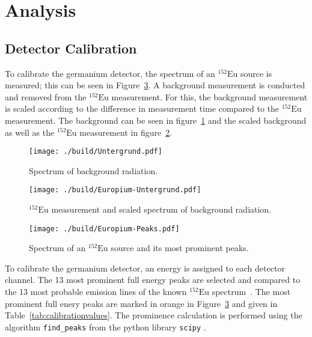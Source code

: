\section{Analysis}
\subsection{Detector Calibration}
To calibrate the germanium detector, the spectrum of an $^{152}\text{Eu}$
source is measured; this can be seen in Figure~\ref{fig:spectrumeu}. A
background measurement is conducted and removed from the $^{152}\text{Eu}$
measurement. For this, the background measurement is scaled according to
the difference in measurement time compared to the $^{152}\text{Eu}$
measurement. The background can be seen in figure~\ref{fig:background} and
the scaled background as well as the $^{152}\text{Eu}$ measurement in
figure~\ref{fig:eubackground}.
\begin{figure}
	\centering
	\begin{adjustbox}{width=1.4\textwidth, center}
		\texttt{[image: ./build/Untergrund.pdf]}
	\end{adjustbox}
	\caption{Spectrum of background radiation.}
	\label{fig:background}
\end{figure}
\begin{figure}
	\centering
	\begin{adjustbox}{width=1.4\textwidth, center}
		\texttt{[image: ./build/Europium-Untergrund.pdf]}
	\end{adjustbox}
	\caption{$^{152}\text{Eu}$ measurement and scaled spectrum of background radiation.}
	\label{fig:eubackground}
\end{figure}
\begin{figure}
	\centering
	\begin{adjustbox}{width=1.4\textwidth, center}
		\texttt{[image: ./build/Europium-Peaks.pdf]}
	\end{adjustbox}
	\caption{Spectrum of an $^{152}\text{Eu}$ source and its most prominent peaks.}
	\label{fig:spectrumeu}
\end{figure}
\noindent
To calibrate the germanium detector, an energy is assigned to each detector channel.
The 13 most prominent full energy peaks are selected and compared to the 13 most probable emission
lines of the known $^{152}\text{Eu}$ spectrum~\cite{laraweb}. The most prominent full enery peaks are marked in
orange in Figure~\ref{fig:spectrumeu} and given in Table~\ref{tab:calibrationvalues}. The prominence
calculation is performed using the algorithm \texttt{find\_peaks} from the python library \texttt{scipy} \cite{scipy}.
